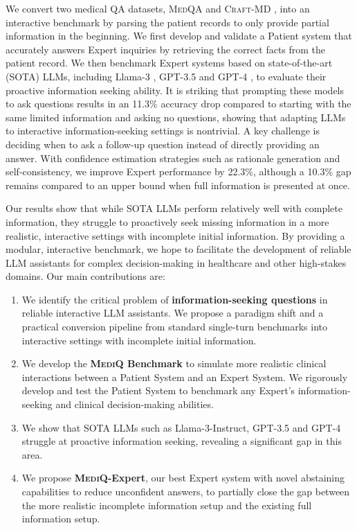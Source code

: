 \documentclass{article}
\begin{document}
We convert two medical QA datasets, \textsc{MedQA} \citep{jin2021disease} and \textsc{Craft-MD} \citep{johri2023testing, johri2024craftmd}, into an interactive benchmark by parsing the patient records to only provide partial information in the beginning. 
We first develop and validate a Patient system that accurately answers Expert inquiries by retrieving the correct facts from the patient record.
We then benchmark Expert systems based on state-of-the-art (SOTA) LLMs, including Llama-3 \citep{touvron2023llama}, GPT-3.5 \citep{brown2020language} and GPT-4 \citep{openai2024gpt4}, to evaluate their proactive information seeking ability. 
It is striking that prompting these models to ask questions results in an 11.3\% accuracy drop 
compared to starting with the same limited information and asking no questions, showing that adapting LLMs to interactive information-seeking settings is nontrivial. 
A key challenge is deciding when to ask a follow-up question instead of directly providing an answer.
With confidence estimation strategies such as rationale generation and self-consistency, we improve Expert performance by 22.3\%, although a 10.3\% gap remains compared to an upper bound when full information is presented at once.

Our results show that while SOTA LLMs perform relatively well with complete information, they struggle to proactively seek missing information in a more realistic, interactive settings with incomplete initial information. 
By providing a modular, interactive benchmark, we hope to facilitate the development of reliable LLM assistants for complex decision-making in healthcare and other high-stakes domains.
Our main contributions are:
\begin{enumerate}
[itemsep=1pt,topsep=0pt,leftmargin=12pt] 
    \item We identify the critical problem of \textbf{information-seeking questions} in reliable interactive LLM assistants. We propose a paradigm shift and a practical conversion pipeline from standard single-turn benchmarks into interactive settings with incomplete initial information. 
    \item We develop the \textbf{\textsc{MediQ} Benchmark} to simulate more realistic clinical interactions between a Patient System and an Expert System. We rigorously develop and test the Patient System to benchmark any Expert's information-seeking and clinical decision-making abilities. 
    \item We show that SOTA LLMs such as Llama-3-Instruct, GPT-3.5 and GPT-4 struggle at proactive information seeking, revealing a significant gap in this area.
    \item We propose \textbf{\textsc{MediQ}-Expert}, our best Expert system with novel abstaining capabilities to reduce unconfident answers, to partially close the gap between the more realistic incomplete information setup and the existing full information setup.
\end{enumerate}
\end{document}
